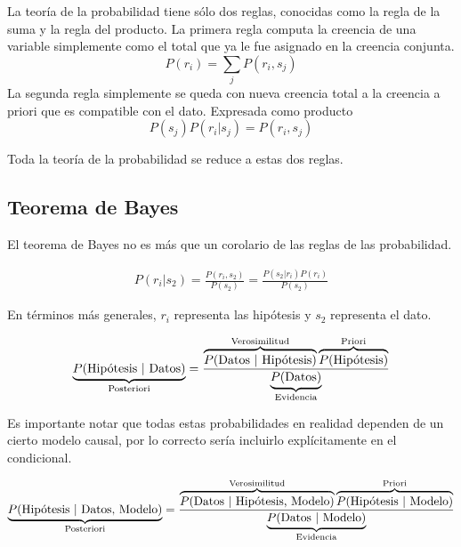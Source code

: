 \documentclass[a4paper,10pt]{book}
\theoremstyle{definition}
\begin{document}

La teoría de la probabilidad tiene sólo dos reglas, conocidas como la regla de la suma y la regla del producto.
La primera regla computa la creencia de una variable simplemente como el total que ya le fue asignado en la creencia conjunta.
\begin{equation}
P(r_i) = \sum_j P(r_i, s_j)
\end{equation}
La segunda regla simplemente se queda con nueva creencia total a la creencia a priori que es compatible con el dato.
Expresada como producto
\begin{equation}
P(s_j)P(r_i|s_j) = P(r_i, s_j)
\end{equation}

Toda la teoría de la probabilidad se reduce a estas dos reglas.

\subsection{Teorema de Bayes}

El teorema de Bayes no es más que un corolario de las reglas de las probabilidad.

\begin{equation}
\begin{split}
P(r_i|s_2) = \frac{P(r_i, s_2)}{P(s_2)} = \frac{P(s_2|r_i)P(r_i)}{P(s_2)} 
\end{split}
\end{equation}

En términos más generales, $r_i$ representa las hipótesis y $s_2$ representa el dato.

\begin{equation*}
\underbrace{P(\text{Hip\'otesis }|\text{ Datos})}_{\text{\scriptsize Posteriori}} = \frac{\overbrace{P(\text{Datos }|\text{ Hip\'otesis})}^{\text{\scriptsize Verosimilitud}} \overbrace{P(\text{Hip\'otesis})}^{\text{\scriptsize Priori}} }{\underbrace{P(\text{Datos})}_{\text{\scriptsize Evidencia}}}
\end{equation*}

Es importante notar que todas estas probabilidades en realidad dependen de un cierto modelo causal, por lo correcto sería incluirlo explícitamente en el condicional.


\begin{equation*}
\underbrace{P(\text{Hip\'otesis }|\text{ Datos, Modelo})}_{\text{\scriptsize Posteriori}} = \frac{\overbrace{P(\text{Datos }|\text{ Hip\'otesis, Modelo})}^{\text{\scriptsize Verosimilitud}} \overbrace{P(\text{Hip\'otesis }|\text{ Modelo})}^{\text{\scriptsize Priori}} }{\underbrace{P(\text{Datos }|\text{ Modelo})}_{\text{\scriptsize Evidencia}}}
\end{equation*}
\end{document}
